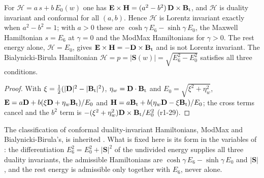 \begin{proposition}
\label{r1:prop:ham}
For $\mathcal H=a\,s+b\,E_0(w)$ one has $\mathbf E\times\mathbf H=(a^2-b^2)\,\mathbf D\times\mathbf B_{\rm t}$, and $\mathcal H$ is duality invariant and
conformal for all $(a,b)$. Hence $\mathcal H$ is Lorentz invariant exactly when $a^2-b^2=1$; with $a>0$ these are
$\cosh\gamma\,E_6-\sinh\gamma\,E_0$, the Maxwell Hamiltonian $s=E_6$ at $\gamma=0$ and the ModMax Hamiltonians for $\gamma>0$. The rest energy alone, $\mathcal H=E_0$, gives $\mathbf E\times\mathbf H=-\mathbf D\times\mathbf B_{\rm t}$
and is not Lorentz invariant. The Bialynicki-Birula Hamiltonian $\mathcal H=p=|\mathbf S(w)|=\sqrt{E_6^2-E_0^2}$ satisfies all three
conditions.
\end{proposition}

\begin{proof}
With $\xi=\tfrac12(|\mathbf D|^2-|\mathbf B_{\rm t}|^2)$, $\eta_w=\mathbf D\cdot\mathbf B_{\rm t}$ and $E_0=\sqrt{\xi^2+\eta_w^2}$,
$\mathbf E=a\mathbf D+b(\xi\mathbf D+\eta_w\mathbf B_{\rm t})/E_0$ and $\mathbf H=a\mathbf B_{\rm t}+b(\eta_w\mathbf D-\xi\mathbf B_{\rm t})/E_0$; the cross terms cancel and the
$b^2$ term is $-(\xi^2+\eta_w^2)\mathbf D\times\mathbf B_{\rm t}/E_0^2$ (r1-29).
\end{proof}

The classification of conformal duality-invariant Hamiltonians, ModMax and Bialynicki-Birula's, is inherited
\cite{BandosLechnerSorokinTownsend20,BialynickiBirula83}. What is fixed here is its form in the variables of \cite{RE}: the differentiation
$E_6^2=E_0^2+|\mathbf S|^2$ of the undivided energy supplies all three duality invariants, the admissible Hamiltonians are $\cosh\gamma\,E_6-\sinh\gamma\,E_0$
and $|\mathbf S|$, and the rest energy is admissible only together with $E_6$, never alone.

